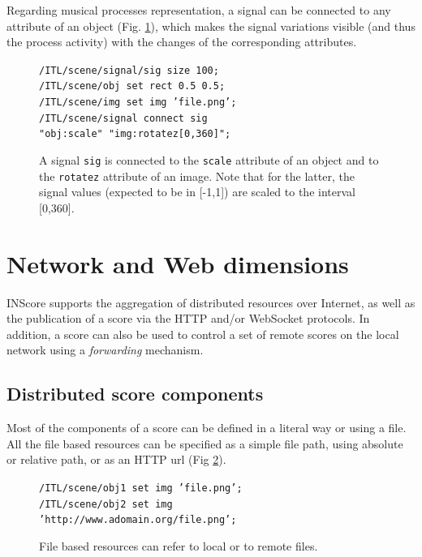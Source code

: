 \documentclass[11pt,a4paper]{article}
\newcommand{\OSC}[1]	{{\fontsize{10pt}{10pt} \selectfont\texttt{#1}}}
\newcommand{\tab}		{\hspace*{4mm}}
\newcommand{\dtab}		{\tab \tab}
\newcommand{\sample}[1]	{\vspace{-0.2em}\begin{center}\colorbox{mygrey}{\begin{minipage}[t]{0.98\columnwidth} {\small \texttt{#1}}\end{minipage}}\end{center}}
\begin{document}
Regarding musical processes representation, a signal can be connected to any attribute of an object (Fig. \ref{fig:sig}), which makes the signal variations visible (and thus the process activity) with the changes of the corresponding attributes.

\begin{figure}[ht]
\begin{center}
\sample{/ITL/scene/signal/sig size 100; \\
/ITL/scene/obj set rect 0.5 0.5; \\
/ITL/scene/img set img 'file.png'; \\
/ITL/scene/signal connect sig \\
\dtab"obj:scale" "img:rotatez[0,360]";
}
\caption{A signal \OSC{sig} is connected to the \OSC{scale} attribute of an object and to the \OSC{rotatez} attribute of an image. Note that for the latter, the signal values (expected to be in [-1,1]) are scaled to the interval [0,360].}
\label{fig:sig}
\end{center}
\end{figure}

\section{Network and Web dimensions}

INScore supports the aggregation of distributed resources over Internet, as well as the publication of a score via the HTTP and/or WebSocket protocols. In addition, a score can also be used to control a set of remote scores on the local network using a \emph{forwarding} mechanism.


\subsection{Distributed score components}

Most of the components of a score can be defined in a literal way or using a file. All the file based resources can be specified as a simple file path, using absolute or relative path, or as an HTTP url (Fig \ref{fig:files}). 

\begin{figure}[ht]
\begin{center}
\sample{/ITL/scene/obj1 set img 'file.png';\\
/ITL/scene/obj2 set img \\
\dtab \tab 'http://www.adomain.org/file.png';
}
\caption{File based resources can refer to local or to remote files.}
\label{fig:files}
\end{center}
\end{figure}
\end{document}

